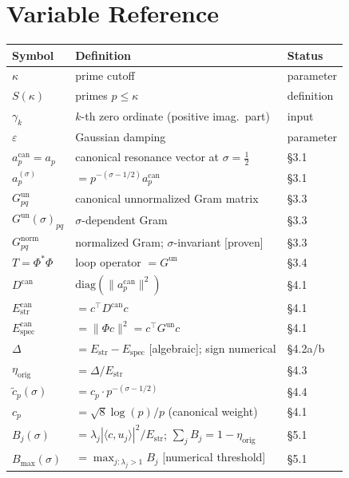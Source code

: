 \documentclass[11pt]{article}
\newcommand{\Estr}{E_{\mathrm{str}}}
\newcommand{\Espec}{E_{\mathrm{spec}}}
\newcommand{\etaorig}{\eta_{\mathrm{orig}}}
\newcommand{\Gun}{G^{\mathrm{un}}}
\newcommand{\Gnorm}{G^{\mathrm{norm}}}
\newcommand{\acan}{a_p^{\mathrm{can}}}
\newcommand{\Dcan}{D^{\mathrm{can}}}
\newcommand{\Estrcan}{\Estr^{\mathrm{can}}}
\newcommand{\Especcan}{\Espec^{\mathrm{can}}}
\begin{document}
\appendix

\section{Variable Reference}

\begin{center}
\renewcommand{\arraystretch}{1.25}
\begin{tabular}{p{3.4cm}p{7.0cm}p{2.0cm}}
\toprule
Symbol & Definition & Status \\
\midrule
$\kappa$ & prime cutoff & parameter \\
$S(\kappa)$ & primes $p\leq\kappa$ & definition \\
$\gamma_k$ & $k$-th zero ordinate (positive imag.\ part) & input \\
$\varepsilon$ & Gaussian damping & parameter \\
$\acan=a_p$ & canonical resonance vector at $\sigma=\tfrac12$ & \S3.1 \\
$a_p^{(\sigma)}$ & $=p^{-(\sigma-1/2)}\acan$ & \S3.1 \\
$\Gun_{pq}$ & canonical unnormalized Gram matrix & \S3.3 \\
$\Gun(\sigma)_{pq}$ & $\sigma$-dependent Gram & \S3.3 \\
$\Gnorm_{pq}$ & normalized Gram; $\sigma$-invariant [proven] & \S3.3 \\
$T=\Phi^*\Phi$ & loop operator $=\Gun$ & \S3.4 \\
$\Dcan$ & $\mathrm{diag}(\|\acan\|^2)$ & \S4.1 \\
$\Estrcan$ & $=c^\top\Dcan c$ & \S4.1 \\
$\Especcan$ & $=\|\Phi c\|^2=c^\top\Gun c$ & \S4.1 \\
$\Delta$ & $=\Estr-\Espec$ [algebraic]; sign numerical & \S4.2a/b \\
$\etaorig$ & $=\Delta/\Estr$ & \S4.3 \\
$\tilde{c}_p(\sigma)$ & $=c_p\cdot p^{-(\sigma-1/2)}$ & \S4.4 \\
$c_p$ & $=\sqrt{8}\log(p)/p$ (canonical weight) & \S4.1 \\
$B_j(\sigma)$ & $=\lambda_j|\langle c,u_j\rangle|^2/\Estr$; $\sum_jB_j=1-\etaorig$ & \S5.1 \\
$B_{\max}(\sigma)$ & $=\max_{j:\lambda_j>1}B_j$ [numerical threshold] & \S5.1 \\
\bottomrule
\end{tabular}
\end{center}
\end{document}
